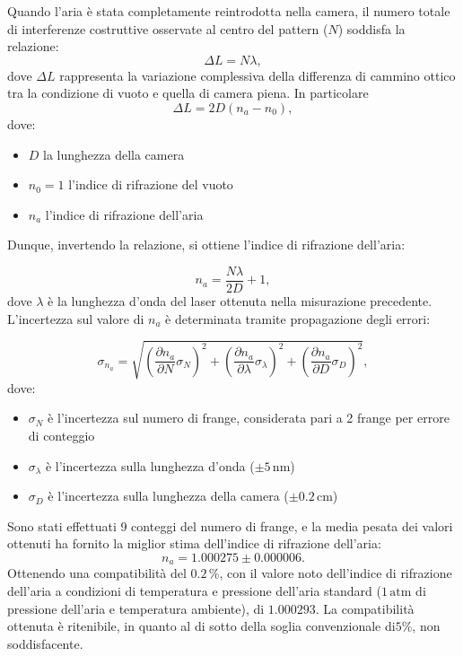 \documentclass[a4paper,12pt]{article}
\begin{document}
Quando l’aria è stata completamente reintrodotta nella camera, il numero totale di interferenze costruttive osservate al centro del pattern (\(N\)) soddisfa la relazione:
\begin{equation}
\Delta L = N\lambda,
\label{eq:delta_cammino_ottico}
\end{equation}
dove \( \Delta L \) rappresenta la variazione complessiva della differenza di cammino ottico tra la condizione di vuoto e quella di camera piena. In particolare
\[
\Delta L = 2D (n_a - n_0),
\]
dove:
\begin{itemize}
    \item \( D \) la lunghezza della camera
    \item \( n_0 = 1 \) l'indice di rifrazione del vuoto
    \item \( n_a \) l'indice di rifrazione dell’aria
\end{itemize}
Dunque, invertendo la relazione, si ottiene l’indice di rifrazione dell’aria:

\begin{equation}
n_a = \frac{N\lambda}{2D} + 1,
\label{eq:indice_rifrazione}
\end{equation}
dove \( \lambda \) è la lunghezza d’onda del laser ottenuta nella misurazione precedente.
L’incertezza sul valore di \( n_a \) è determinata tramite propagazione degli errori:

\begin{equation}
\sigma_{n_a} = \sqrt{\left(\frac{\partial n_a}{\partial N} \sigma_N\right)^2 + \left(\frac{\partial n_a}{\partial \lambda} \sigma_\lambda\right)^2 + \left(\frac{\partial n_a}{\partial D} \sigma_D\right)^2},
\label{eq:incertezza_indice}
\end{equation}
dove:
\begin{itemize}
    \item \( \sigma_N \) è l’incertezza sul numero di frange, considerata pari a 2 frange per errore di conteggio
    \item \( \sigma_\lambda \) è l’incertezza sulla lunghezza d’onda (\( \pm 5 \, \text{nm} \))
    \item \( \sigma_D \) è l’incertezza sulla lunghezza della camera (\( \pm 0.2 \, \text{cm} \))
\end{itemize}
Sono stati effettuati 9 conteggi del numero di frange, e la media pesata dei valori ottenuti ha fornito la miglior stima dell’indice di rifrazione dell’aria:
\begin{equation}
n_a = 1.000275 \pm 0.000006.
\label{eq:valore_na}
\end{equation}
Ottenendo una compatibilità del \( 0.2 \, \% \), con il valore noto dell’indice di rifrazione dell’aria a condizioni di temperatura e pressione dell’aria standard (\( 1 \, \text{atm} \) di pressione dell’aria e temperatura ambiente), di \( 1.000293 \). La compatibilità ottenuta è ritenibile, in quanto al di sotto della soglia convenzionale di\(5\%\), non soddisfacente. 
\end{document}
